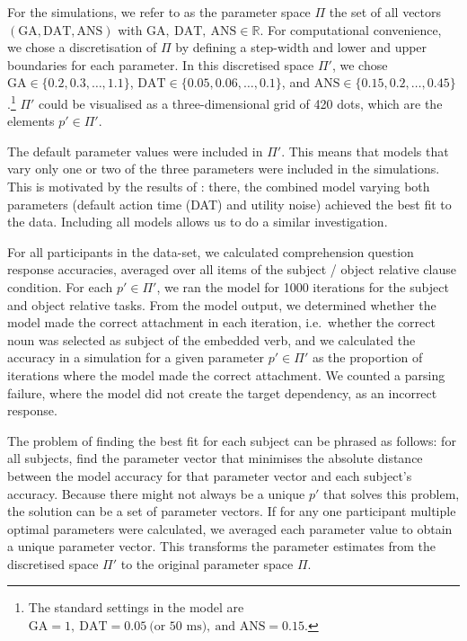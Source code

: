 \documentclass[10pt,letterpaper]{article}
\begin{document}
For the simulations, we refer to as the parameter space $\Pi$ the set of all vectors $(\text{GA}, \text{DAT}, \text{ANS})$ with $\text{GA},\ \text{DAT},\ \text{ANS} \in \mathbb{R}$.
For computational convenience, we chose a discretisation of $\Pi$ by defining a step-width and lower and upper boundaries for each parameter. In this discretised space $\Pi'$, we chose $\text{GA} \in \{0.2, 0.3, \ldots, 1.1\}$, $\text{DAT} \in \{0.05, 0.06, \ldots, 0.1\}$, and $\text{ANS} \in \{0.15, 0.2, \ldots, 0.45\}$.\footnote{The standard settings in the  model are $\text{GA} = 1,\ \text{DAT} = 0.05\ \text{(or 50 ms)},\ \text{and ANS} = 0.15$.} $\Pi'$ could be visualised as a three-dimensional grid of 420 dots, which are the elements $p' \in \Pi'$.

The default parameter values were included in $\Pi'$. This means that models that vary only one or two of the three parameters were included in the simulations. This is motivated by the results of : there, the combined model varying both parameters (default action time (DAT) and utility noise) achieved the best fit to the data. Including all models allows us to do a similar investigation.

For all participants in the  data-set, we calculated comprehension question response accuracies, averaged over all items of the subject / object relative clause condition. For each $p' \in \Pi'$, we ran the model for 1000 iterations for the subject and object relative tasks.
From the model output, we determined whether the model made the correct attachment in each iteration, i.e.\ whether the correct noun was selected as subject of the embedded verb, and we calculated the accuracy in a simulation for a given parameter $p' \in \Pi'$ as the proportion of iterations where the model made the correct attachment. We counted a parsing failure, where the model did not create the target dependency, as an incorrect response.

The problem of finding the best fit for each subject can be phrased as follows: for all subjects, find the parameter vector that minimises the absolute distance between the model accuracy for that parameter vector and each subject's accuracy. Because there might not always be a unique $p'$ that solves this problem, the solution can be a set of parameter vectors.
If for any one participant multiple optimal parameters were calculated, we averaged each parameter value to obtain a unique parameter vector. This transforms the parameter estimates from the discretised space $\Pi'$ to the original parameter space $\Pi$.
\end{document}
